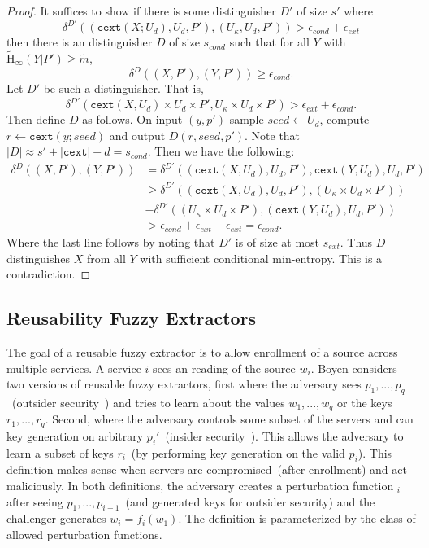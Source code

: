 \documentclass[11pt]{article}
\newcommand{\Hav}{\tilde{\mathrm{H}}_\infty}
\newcommand{\cext}{\ensuremath{\mathtt{cext}}}
\begin{document}
\begin{proof}
It suffices to show if there is some distinguisher $D'$ of size $s'$ where
\[\delta^{D'}((\cext(X; U_d), U_d, P'), (U_\kappa, U_d, P'))>\epsilon_{cond}+ \epsilon_{ext}\]
 then there is an distinguisher $D$ of size $s_{cond}$ such that for all $Y$ with $\Hav(Y|P') \geq \tilde{m}$,
 \[
 \delta^{D}((X,P'), (Y, P'))\geq \epsilon_{cond}.
 \]
Let $D'$ be such a distinguisher.  That is,
\[
\delta^{D'}(\cext(X, U_d)\times U_d \times P', U_\kappa\times U_d\times P')> \epsilon_{ext}+\epsilon_{cond}.
\]
Then define $D$ as follows.  On input $(y, p')$ sample $seed\leftarrow U_d$, compute $r\leftarrow \cext(y; seed)$ and output $D(r, seed, p')$.  Note that $|D| \approx s' + |\cext| +d= s_{cond}$.  Then we have the following:
\begin{align*}
\delta^{D}((X, P'), (Y, P'))&= \delta^{D'}((\cext(X, U_d), U_d, P'), \cext(Y, U_d), U_d, P')\\
&\geq \delta^{D'}((\cext(X, U_d), U_d, P'), (U_\kappa\times U_d \times P')) \\
&- \delta^{D'}((U_\kappa\times U_d \times P'), (\cext(Y, U_d), U_d, P'))\\
&>\epsilon_{cond}+\epsilon_{ext}- \epsilon_{ext} = \epsilon_{cond}.
\end{align*}
Where the last line follows by noting that $D'$ is of size at most $s_{ext}$.  Thus $D$ distinguishes $X$ from all $Y$ with sufficient conditional min-entropy.  This is a contradiction.
\end{proof}

\subsection{Reusability Fuzzy Extractors}
\label{sec:comparing reusability}

The goal of a reusable fuzzy extractor is to allow enrollment of a source across multiple services.  A service $i$ sees an reading of the source $w_i$.
Boyen considers two versions of reusable fuzzy extractors, first where the adversary sees $p_1,..., p_q$~(outsider security~\cite[Definition 6]{Boyen2004}) and tries to learn about the values $w_1,..., w_q$ or the keys $r_1,..., r_q$.  Second, where the adversary controls some subset of the servers and can key generation on arbitrary $p_i'$~(insider security~\cite[Definition 7]{Boyen2004}).   This allows the adversary to learn a subset of keys $r_i$~(by performing key generation on the valid $p_i$).  This definition makes sense when servers are compromised~(after enrollment) and act maliciously.  In both definitions, the adversary creates a perturbation function $_i$ after seeing $p_1,..., p_{i-1}$~(and generated keys for outsider security) and the challenger generates $w_i = f_i(w_1)$.  The definition is parameterized by the class of allowed perturbation functions.
\end{document}
